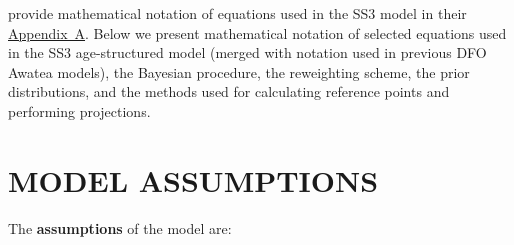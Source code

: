 \documentclass[11pt]{book}
\begin{document}
\citet{Methot-Wetzel:2013} provide mathematical notation of equations used in the SS3 model in their \href{https://sedarweb.org/docs/wsupp/S39_RD_08_Methot_and_Wetzel_2013_Fish_Res_App_A.pdf}{Appendix~A}.
Below we present mathematical notation of selected equations used in the SS3 age-structured model (merged with notation used in previous DFO Awatea models), the Bayesian procedure, the reweighting scheme, the prior distributions, and the methods used for calculating reference points and performing projections.

\section{MODEL ASSUMPTIONS}

The \textbf{assumptions} of the model are:
\end{document}
